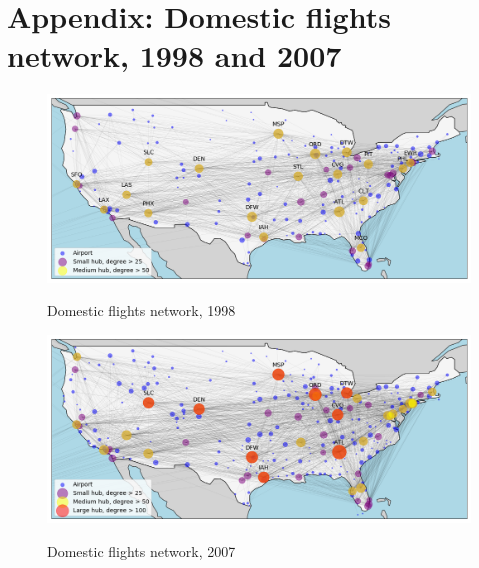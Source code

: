 \section{Appendix: Domestic flights network, 1998 and 2007}
\label{app:map_general}
\begin{figure}[H]
  \centering
  \caption{Domestic flights network, 1998}
    \includegraphics[width=1. \textwidth]{Exam/Figures/map_general_98}
    \vspace{-0.7cm}
  \label{fig:map_general_98}
\end{figure}

\begin{figure}[H]
  \centering
  \caption{Domestic flights network, 2007}
    \includegraphics[width=1. \textwidth]{Exam/Figures/map_general_07}
    \vspace{-0.7cm}
  \label{fig:map_general_07}
\end{figure}
